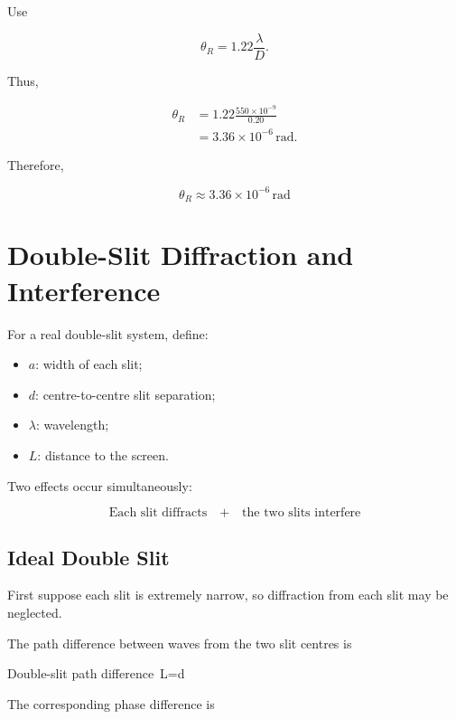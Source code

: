 \documentclass{studentnotes}
\begin{document}
Use

\[
    \theta_R
    =
    1.22\frac{\lambda}{D}.
\]

Thus,

\[
    \begin{aligned}
        \theta_R
         & =
        1.22
        \frac{550\times10^{-9}}{0.20} \\
         & =
        3.36\times10^{-6}\,\text{rad}.
    \end{aligned}
\]

Therefore,

\[
    \boxed{
        \theta_R
        \approx
        3.36\times10^{-6}\,\text{rad}
    }
\]

\section{Double-Slit Diffraction and Interference}

For a real double-slit system, define:

\begin{itemize}
    \item \(a\): width of each slit;
    \item \(d\): centre-to-centre slit separation;
    \item \(\lambda\): wavelength;
    \item \(L\): distance to the screen.
\end{itemize}

Two effects occur simultaneously:

\[
    \boxed{
        \text{Each slit diffracts}
        \quad+\quad
        \text{the two slits interfere}
    }
\]

\subsection{Ideal Double Slit}

First suppose each slit is extremely narrow, so diffraction from each slit may be neglected.

The path difference between waves from the two slit centres is

\begin{namedformula}{Double-slit path difference}
    \Delta\,L=d\sin\theta%
\end{namedformula}

The corresponding phase difference is
\end{document}
